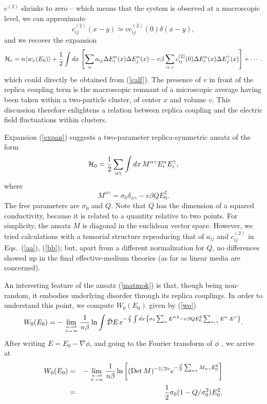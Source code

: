 $c^{(2)}$ shrinks to zero -- which means that the system is observed
at a macroscopic level, we can approximate
\begin{equation}
c^{(2)}_{ij}(x-y)\simeq v c^{(2)}_{ij}(0)\delta(x-y),
\end{equation}
and we recover the expansion
\begin{equation}
\label{expan}
{\cal{H}}_e=n\langle w_x(E_0)\rangle+\frac{1}{2}\int dx\,\left[ \sum_{\alpha}a_{ij}\Delta E^\alpha_i(x)\Delta E^\alpha_j(x)-v\beta \sum_{\alpha,\gamma}c^{(2)}_{ij}(0)\Delta E^\alpha_i(x)\Delta E^\gamma_j(x)\right] +\cdots.
\end{equation}
which could directly be obtained from (\ref{calf}). The presence of
$v$ in front of the replica coupling term is the macroscopic remnant
of a microscopic average having been taken within a two-particle
cluster, of center $x$ and volume $v$. This discussion therefore
enlightens a relation between replica coupling and the electric field
fluctuations within clusters.

Expansion (\ref{expan}) suggests a two-parameter
replica-symmetric ansatz of the form
\begin{equation}
\label{ansatz}
{\cal{H}}_0=\frac{1}{2} \sum_{\alpha\gamma}\int dx\, M^{\alpha\gamma}
E^\alpha_i E^\gamma_i,
\end{equation}
where
\begin{equation}
\label{matmok}
M^{\alpha\gamma}=\sigma_0\delta_{\alpha\gamma}-v\beta Q E_0^2.
\end{equation}
The free parameters are $\sigma_0$ and $Q$. Note that $Q$ has the
dimension of a squared conductivity, because it is related to a
quantity relative to two points. For simplicity, the ansatz $M$ is
diagonal in the euclidean vector space. However, we tried calculations
with a tensorial structure reproducing that of $a_{ij}$ and
$c^{(2)}_{ij}$ in Eqs.\ (\ref{aa}), (\ref{bb}); but, apart from a
different normalization for $Q$, no differences showed up in the final
effective-medium theories (as far as linear media are concerned).

An interesting feature of the ansatz (\ref{matmok}) is that, though
being non-random, it embodies underlying disorder through its replica
couplings. In order to understand this point, we compute
$W_0(E_0)$ given by (\ref{wo})
\begin{equation}
\label{wopath}
W_0(E_0)=-\lim_{n\to 0\atop \beta\to\infty}\frac{1}{n\beta}\ln \int
\tilde{\cal{D}} E\,e^{-\frac{\beta}{2}\int dx\,\left(\sigma_0\sum_\alpha{E^\alpha}^2-v\beta Q E_0^2 \sum_{\alpha,\gamma}{E^\alpha}\cdot{E^\gamma}\right)}.
\end{equation}
After writing $E=E_0-\nabla \phi$, and going to the Fourier transform
of $\phi$ \cite{NOTE2}, we arrive at
\begin{eqnarray}
W_0(E_0)&=&-\lim_{n\to 0\atop \beta\to\infty}\frac{1}{n\beta}\ln
\left[(\mathop{\text{Det}}M)^{-1/2v} e^{-\frac{\beta}{2}\sum_{\alpha\gamma} M_{\alpha\gamma}E_0^2}\right]\nonumber\\
\label{wocomp}
&=&\frac{1}{2}\sigma_0(1-Q/\sigma_0^2) E_0^2.
\end{eqnarray}

